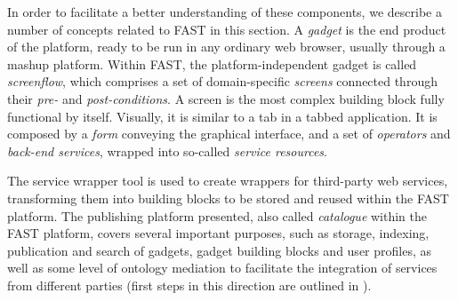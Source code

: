 In order to facilitate a better understanding of these components, we describe a number of concepts related to FAST in this section. 
A \emph{gadget} is the end product of the platform, ready to be run in any ordinary web browser, usually through a mashup platform. 
Within FAST, the platform-independent gadget is called \emph{screenflow}, which comprises a set of domain-specific \emph{screens} connected through their \emph{pre-} and \emph{post-conditions}. A screen is the most complex building block fully functional by itself. 
Visually, it is similar to a tab in a tabbed application.
It is composed by a \emph{form} conveying the graphical interface, and a set of \emph{operators} and \emph{back-end services}, wrapped into so-called \emph{service resources}.

The service wrapper tool is used to create wrappers for third-party web services, transforming them into building blocks to be stored and reused within the FAST platform. The publishing platform presented, also called \emph{catalogue} within the FAST platform, covers several important purposes, such as storage, indexing, publication and search of gadgets, gadget building blocks and user profiles, as well as some level of ontology mediation to facilitate the integration of services from different parties (first steps in this direction are outlined in \cite{Ambrus:2009it}).
